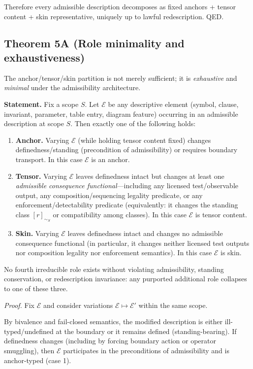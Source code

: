 \documentclass[12pt]{article}
\theoremstyle{plain}
\begin{document}
Therefore every admissible description decomposes as fixed anchors + tensor content + skin representative, uniquely up to lawful redescription. QED.


\subsection{Theorem 5A (Role minimality and exhaustiveness)}

The anchor/tensor/skin partition is not merely sufficient; it is \emph{exhaustive} and \emph{minimal} under the admissibility architecture.

\medskip

\noindent\textbf{Statement.} Fix a scope $S$. Let $\mathcal{E}$ be any descriptive element (symbol, clause, invariant, parameter, table entry, diagram feature) occurring in an admissible description at scope $S$. Then exactly one of the following holds:

\begin{enumerate}[leftmargin=*]
\item \textbf{Anchor.} Varying $\mathcal{E}$ (while holding tensor content fixed) changes definedness/standing (precondition of admissibility) or requires boundary transport. In this case $\mathcal{E}$ is an anchor.
\item \textbf{Tensor.} Varying $\mathcal{E}$ leaves definedness intact but changes at least one \emph{admissible consequence functional}---including any licensed test/observable output, any composition/sequencing legality predicate, or any enforcement/detectability predicate (equivalently: it changes the standing class $[r]_{\sim_S}$ or compatibility among classes). In this case $\mathcal{E}$ is tensor content.
\item \textbf{Skin.} Varying $\mathcal{E}$ leaves definedness intact and changes no admissible consequence functional (in particular, it changes neither licensed test outputs nor composition legality nor enforcement semantics). In this case $\mathcal{E}$ is skin.
\end{enumerate}

No fourth irreducible role exists without violating admissibility, standing conservation, or redescription invariance: any purported additional role collapses to one of these three.

\textit{Proof.} Fix $\mathcal{E}$ and consider variations $\mathcal{E}\mapsto \mathcal{E}'$ within the same scope.

By bivalence and fail-closed semantics, the modified description is either ill-typed/undefined at the boundary or it remains defined (standing-bearing). If definedness changes (including by forcing boundary action or operator smuggling), then $\mathcal{E}$ participates in the preconditions of admissibility and is anchor-typed (case 1).
\end{document}
